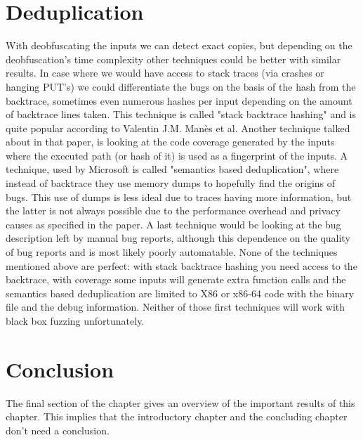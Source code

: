 \section{Deduplication}
\label{cha:3:Deduplication}
With deobfuscating the inputs we can detect exact copies, but depending on the deobfuscation's time complexity other techniques could be better with similar results. In case where we would have access to stack traces (via crashes or hanging PUT's) we could differentiate the bugs on the basis of the hash from the backtrace, sometimes even numerous hashes per input depending on the amount of backtrace lines taken. This technique is called "stack backtrace hashing" and is quite popular according to Valentin J.M. Man\`es et al. \cite{13manes2019survey} 
Another technique talked about in that paper, is looking at the code coverage generated by the inputs where the executed path (or hash of it) is used as a fingerprint of the inputs. A technique, used by Microsoft \cite{36semanticsAwareDeduplicationRETracer} is called "semantics based deduplication", where instead of backtrace they use memory dumps to hopefully find the origins of bugs. This use of dumps is less ideal due to traces having more information, but the latter is not always possible due to the performance overhead and privacy causes as specified in the paper. 
A last technique would be looking at the bug description left by manual bug reports, although this dependence on the quality of bug reports and is most likely poorly automatable. 
None of the techniques mentioned above are perfect: with stack backtrace hashing you need access to the backtrace, with coverage some inputs will generate extra function calls and the semantics based deduplication are limited to X86 or x86-64 code with the binary file and the debug information. Neither of those first techniques will work with black box fuzzing unfortunately.

\section{Conclusion}
\label{cha:3:Conclusion}
The final section of the chapter gives an overview of the important results
of this chapter. This implies that the introductory chapter and the
concluding chapter don't need a conclusion.


